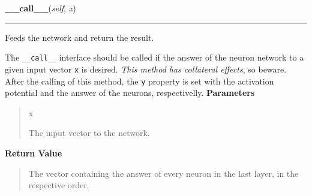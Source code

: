     \vspace{0.5ex}

\hspace{.8\funcindent}\begin{boxedminipage}{\funcwidth}

    \raggedright \textbf{\_\_call\_\_}(\textit{self}, \textit{x})

    \vspace{-1.5ex}

    \rule{\textwidth}{0.5\fboxrule}
\setlength{\parskip}{2ex}

Feeds the network and return the result.

The \texttt{\_\_call\_\_} interface should be called if the answer of the neuron
network to a given input vector \texttt{x} is desired. \emph{This method has
collateral effects}, so beware. After the calling of this method, the
\texttt{y} property is set with the activation potential and the answer of
the neurons, respectivelly.
\setlength{\parskip}{1ex}
      \textbf{Parameters}
      \vspace{-1ex}

      \begin{quote}
        \begin{Ventry}{x}

          \item[x]


The input vector to the network.
        \end{Ventry}

      \end{quote}

      \textbf{Return Value}
    \vspace{-1ex}

      \begin{quote}

The vector containing the answer of every neuron in the last layer, in
the respective order.
      \end{quote}

    \end{boxedminipage}

    \label{peach:nn:rbfn:RBFN:learn}

    \vspace{0.5ex}

